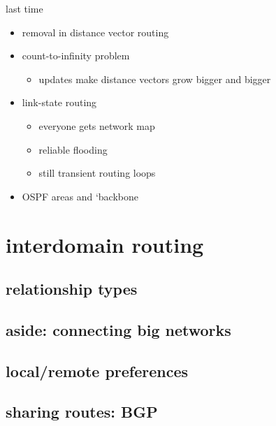 \date{}
\title{}
\date{}

\begin{frame}
    \titlepage
\end{frame}

\begin{frame}{last time}
    \begin{itemize}
    \item removal in distance vector routing
    \item count-to-infinity problem
        \begin{itemize}
        \item updates make distance vectors grow bigger and bigger
        \end{itemize}
    \item link-state routing
        \begin{itemize}
        \item everyone gets network map
        \item reliable flooding
        \item still transient routing loops
        \end{itemize}
    \item OSPF areas and `backbone
    \end{itemize}
\end{frame}

\section{interdomain routing}
\subsection{relationship types}


\subsection{aside: connecting big networks}


\subsection{local/remote preferences}


\subsection{sharing routes: BGP}


